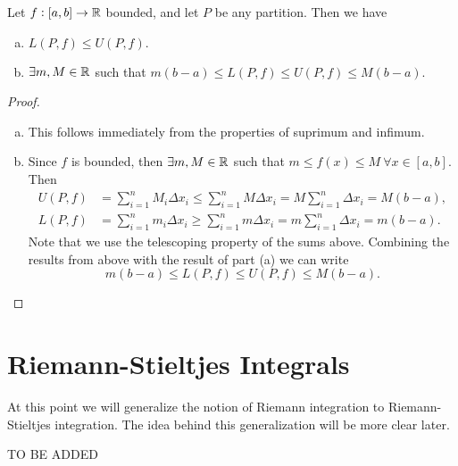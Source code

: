 \begin{proposition}
	Let $f: [a,b] \to \mathbb{R}$ bounded, and let $P$ be any partition. Then we have
	\begin{enumerate}[(a)]
		\item $L(P,f) \leq U(P,f).$
		\item $\exists m,M \in \mathbb{R}$ such that $m(b-a) \leq L(P,f) \leq U(P,f) \leq M(b-a)$.
	\end{enumerate}

\end{proposition}
\begin{proof}
	\begin{enumerate}[(a)]
		\item This follows immediately from the properties of suprimum and infimum.
		\item Since $f$ is bounded, then $\exists m,M \in \mathbb{R}$ such that $m \leq f(x) \leq M\ \forall x \in [a,b]$. Then
		\begin{align*}
			U(P,f) &= \sum_{i=1}^{n} M_i \Delta x_i \leq \sum_{i=1}^{n} M \Delta x_i = M \sum_{i=1}^{n} \Delta x_i  = M(b-a),\\
			L(P,f) &= \sum_{i=1}^{n} m_i \Delta x_i \geq \sum_{i=1}^{n} m \Delta x_i = m \sum_{i=1}^{n} \Delta x_i  = m(b-a).
		\end{align*}
		Note that we use the telescoping property of the sums above. Combining the results from above with the result of part (a) we can write
		\[ m(b-a) \leq L(P,f) \leq U(P,f) \leq M(b-a). \] 
	\end{enumerate}
\end{proof}

\section{Riemann-Stieltjes Integrals}
At this point we will generalize the notion of Riemann integration to Riemann-Stieltjes integration. The idea behind this generalization will be more clear later. 

\begin{definition}
	TO BE ADDED
\end{definition}

